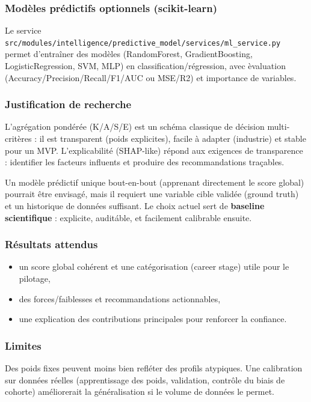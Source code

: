 \documentclass[11pt,a4paper]{article}
\begin{document}
\subsubsection*{Mod\`eles pr\'edictifs optionnels (scikit-learn)}
Le service \texttt{src/modules/intelligence/predictive\_model/services/ml\_service.py} permet d'entra\^iner des mod\`eles (RandomForest, GradientBoosting, LogisticRegression, SVM, MLP) en classification/r\'egression, avec \`evaluation (Accuracy/Precision/Recall/F1/AUC ou MSE/R2) et importance de variables.

\subsubsection*{Justification de recherche}
L'agr\'egation pond\'er\'ee (K/A/S/E) est un sch\'ema classique de d\'ecision multi-crit\`eres : il est transparent (poids explicites), facile \`a adapter (industrie) et stable pour un MVP. L'explicabilit\'e (SHAP-like) r\'epond aux exigences de transparence : identifier les facteurs influents et produire des recommandations tra\c{c}ables.

 Un mod\`ele pr\'edictif unique \og bout-en-bout \fg{} (apprenant directement le score global) pourrait \^etre envisag\'e, mais il requiert une variable cible valid\'ee (ground truth) et un historique de donn\'ees suffisant. Le choix actuel sert de \textbf{baseline scientifique} : explicite, audit\'able, et facilement calibrable ensuite.

\subsubsection*{R\'esultats attendus}
\begin{itemize}
    \item un score global coh\'erent et une cat\'egorisation (career stage) utile pour le pilotage,
    \item des forces/faiblesses et recommandations actionnables,
    \item une explication des contributions principales pour renforcer la confiance.
\end{itemize}

\subsubsection*{Limites}
Des poids fixes peuvent moins bien refl\'eter des profils atypiques. Une calibration sur donn\'ees r\'eelles (apprentissage des poids, validation, contr\^ole du biais de cohorte) am\'eliorerait la g\'en\'eralisation si le volume de donn\'ees le permet.
\end{document}
